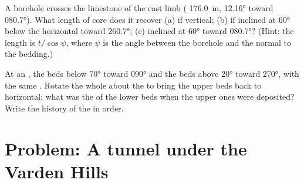 \begin{exercise}[$\star\star\star$]\label{exo:b1:cross-sections:11}
A borehole crosses the limestone of the east limb (
\qty{176.0}{m},  \ang{12.16} toward \ang{080.7}). What length of core
does it recover (a) if vertical; (b) if inclined at \ang{60} below the
horizontal toward \ang{260.7}; (c) inclined at \ang{60} toward \ang{080.7}?
(Hint: the length is $t/\cos\psi$, where $\psi$ is the angle between the
borehole and the normal to the bedding.)
\end{exercise}

\begin{exercise}[$\star\star\star$]\label{exo:b1:cross-sections:12}
At an , the beds below  \ang{70} toward \ang{090}
and the beds above  \ang{20} toward \ang{270}, with the same .
Rotate the whole  about the  to bring the upper beds back to
horizontal: what was the  of the lower beds when the upper ones were
deposited? Write the history of the  in order.
\end{exercise}

\section{Problem: A tunnel under the Varden Hills}

